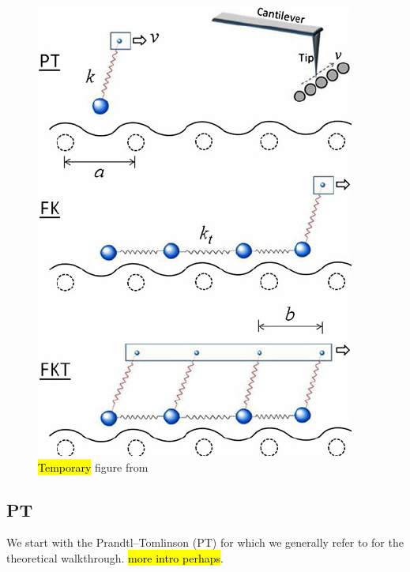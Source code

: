 \begin{figure}[H]
  \centering
  \includegraphics[width=0.4\linewidth]{figures/theory/PT_FK_FKT.png}
  \caption{\hl{Temporary} figure from \cite{Yalin_2011}}
  \label{fig:PT_FK_FKT}
\end{figure}


\subsection{PT}
We start with the Prandtl–Tomlinson (\acrshort{PT}) \cite[2,3]{Yalin_2011} for which we generally refer to \cite{Yalin_2011} for the theoretical walkthrough. \hl{more intro perhaps}.




